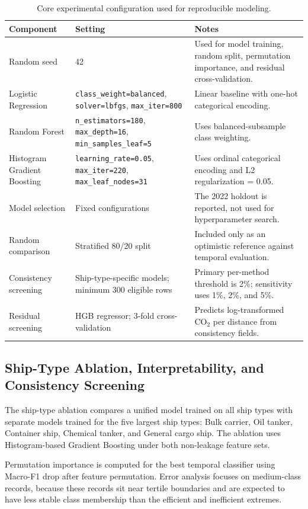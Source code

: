 \documentclass[preprints,article,submit,pdftex,oneauthor]{Definitions/mdpi}
\begin{document}
\begin{table}[H]
\caption{Core experimental configuration used for reproducible modeling.\label{tab:config}}
\begin{tabularx}{\textwidth}{LLX}
\toprule
\textbf{Component} & \textbf{Setting} & \textbf{Notes}\\
\midrule
Random seed & 42 & Used for model training, random split, permutation importance, and residual cross-validation.\\
Logistic Regression & \texttt{class\_weight=balanced}, \texttt{solver=lbfgs}, \texttt{max\_iter=800} & Linear baseline with one-hot categorical encoding.\\
Random Forest & \texttt{n\_estimators=180}, \texttt{max\_depth=16}, \texttt{min\_samples\_leaf=5} & Uses balanced-subsample class weighting.\\
Histogram Gradient Boosting & \texttt{learning\_rate=0.05}, \texttt{max\_iter=220}, \texttt{max\_leaf\_nodes=31} & Uses ordinal categorical encoding and L2 regularization = 0.05.\\
Model selection & Fixed configurations & The 2022 holdout is reported, not used for hyperparameter search.\\
Random comparison & Stratified 80/20 split & Included only as an optimistic reference against temporal evaluation.\\
Consistency screening & Ship-type-specific models; minimum 300 eligible rows & Primary per-method threshold is 2\%; sensitivity uses 1\%, 2\%, and 5\%.\\
Residual screening & HGB regressor; 3-fold cross-validation & Predicts log-transformed CO$_2$ per distance from consistency fields.\\
\bottomrule
\end{tabularx}
\end{table}

\subsection{Ship-Type Ablation, Interpretability, and Consistency Screening}

The ship-type ablation compares a unified model trained on all ship types with separate models trained for the five largest ship types: Bulk carrier, Oil tanker, Container ship, Chemical tanker, and General cargo ship. The ablation uses Histogram-based Gradient Boosting under both non-leakage feature sets.

Permutation importance is computed for the best temporal classifier using Macro-F1 drop after feature permutation. Error analysis focuses on medium-class records, because these records sit near tertile boundaries and are expected to have less stable class membership than the efficient and inefficient extremes.
\end{document}
